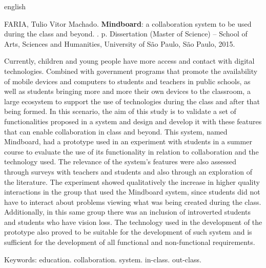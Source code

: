 \documentclass[
	12pt,				%
	oneside,			%
	a4paper,			%
	english,			%
	brazil				%
	]{abntex2ppgsi}
\begin{document}
% 
% 
\begin{resumo}[Abstract]
\begin{otherlanguage*}{english}

% 
%
%
%
\begin{flushleft}
FARIA, Tulio Vitor Machado. \textbf{Mindboard}: a collaboration system to be used during the class and beyond. \imprimirdata. \pageref{LastPage} p. Dissertation (Master of Science) – School of Arts, Sciences and Humanities, University of São Paulo, São Paulo, 2015. 
\end{flushleft}

Currently, children and young people have more access and contact with digital technologies. Combined with government programs that promote the availability of mobile devices and computers to students and teachers in public schools, as well as students bringing more and more their own devices to the classroom, a large ecosystem to support the use of technologies during the class and after that being formed. In this scenario, the aim of this study is to validate a set of functionalities proposed in a system and design and develop it with these features that can enable collaboration in class and beyond. This system, named Mindboard, had a prototype used in an experiment with students in a summer course to evaluate the use of its functionality in relation to collaboration and the technology used. The relevance of the system's features were also assessed through surveys with teachers and students and also through an exploration of the literature. The experiment showed qualitatively the increase in higher quality interactions in the group that used the Mindboard system, since students did not have to interact about problems viewing what was being created during the class. Additionally, in this same group there was an inclusion of introverted students and students who have vision loss. The technology used in the development of the prototype also proved to be suitable for the development of such system and is sufficient for the development of all functional and non-functional requirements.


Keywords: education. collaboration. system. in-class. out-class.
\end{otherlanguage*}
\end{resumo}
\end{document}
